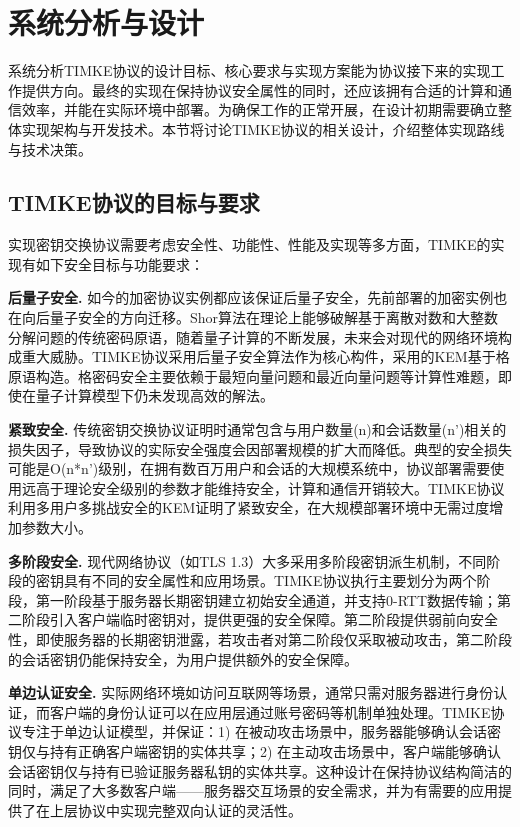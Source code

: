 \section{系统分析与设计}

系统分析TIMKE协议的设计目标、核心要求与实现方案能为协议接下来的实现工作提供方向。最终的实现在保持协议安全属性的同时，还应该拥有合适的计算和通信效率，并能在实际环境中部署。为确保工作的正常开展，在设计初期需要确立整体实现架构与开发技术。本节将讨论TIMKE协议的相关设计，介绍整体实现路线与技术决策。

\subsection{TIMKE协议的目标与要求}
\label{appendix:timke_protocol_goals}
实现密钥交换协议需要考虑安全性、功能性、性能及实现等多方面，TIMKE的实现有如下安全目标与功能要求：

\textbf{后量子安全.} 如今的加密协议实例都应该保证后量子安全，先前部署的加密实例也在向后量子安全的方向迁移。Shor算法在理论上能够破解基于离散对数和大整数分解问题的传统密码原语，随着量子计算的不断发展，未来会对现代的网络环境构成重大威胁。TIMKE协议采用后量子安全算法作为核心构件，采用的KEM基于格原语构造。格密码安全主要依赖于最短向量问题和最近向量问题等计算性难题，即使在量子计算模型下仍未发现高效的解法。

\textbf{紧致安全.} 传统密钥交换协议证明时通常包含与用户数量(n)和会话数量(n')相关的损失因子，导致协议的实际安全强度会因部署规模的扩大而降低。典型的安全损失可能是O(n*n')级别，在拥有数百万用户和会话的大规模系统中，协议部署需要使用远高于理论安全级别的参数才能维持安全，计算和通信开销较大。TIMKE协议利用多用户多挑战安全的KEM证明了紧致安全\cite{timke_2024}，在大规模部署环境中无需过度增加参数大小。

\textbf{多阶段安全.} 现代网络协议（如TLS 1.3\cite{tls13_2018}）大多采用多阶段密钥派生机制，不同阶段的密钥具有不同的安全属性和应用场景。TIMKE协议执行主要划分为两个阶段，第一阶段基于服务器长期密钥建立初始安全通道，并支持0-RTT数据传输；第二阶段引入客户端临时密钥对，提供更强的安全保障。第二阶段提供弱前向安全性，即使服务器的长期密钥泄露，若攻击者对第二阶段仅采取被动攻击，第二阶段的会话密钥仍能保持安全，为用户提供额外的安全保障。

\textbf{单边认证安全.} 实际网络环境如访问互联网等场景，通常只需对服务器进行身份认证，而客户端的身份认证可以在应用层通过账号密码等机制单独处理。TIMKE协议专注于单边认证模型，并保证：1) 在被动攻击场景中，服务器能够确认会话密钥仅与持有正确客户端密钥的实体共享；2) 在主动攻击场景中，客户端能够确认会话密钥仅与持有已验证服务器私钥的实体共享。这种设计在保持协议结构简洁的同时，满足了大多数客户端——服务器交互场景的安全需求，并为有需要的应用提供了在上层协议中实现完整双向认证的灵活性。

